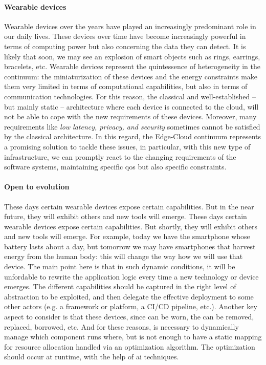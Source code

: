 \documentclass[12pt,a4paper]{article}
\begin{document}
\paragraph{Wearable devices}
Wearable devices over the years have played an increasingly predominant role in our daily lives.
These devices over time have become increasingly powerful in terms of computing power but also concerning the data they can detect.
%
It is likely that soon,
we may see an explosion of smart objects such as rings,
earrings, bracelets, etc. 
%
Wearable devices represent the quintessence of heterogeneity in the continuum:
the miniaturization of these devices and the energy constraints make them very limited in terms of computational capabilities,
but also in terms of communication technologies. 
%
For this reason,
the classical and well-established -- but mainly static -- architecture where each device is connected to the cloud,
will not be able to cope with the new requirements of these devices.
%
Moreover,
many requirements like \emph{low latency, privacy, and security} sometimes cannot be satisfied by the classical architecture. 
%
In this regard,
the Edge-Cloud continuum represents a promising solution to tackle these issues,
in particular,
with this new type of infrastructure,
we can promptly react to the changing requirements of the software systems,
maintaining specific \ac{qos} but also specific constraints.

\paragraph{Open to evolution}
These days certain wearable devices expose certain capabilities.
%
But in the near future,
they will exhibit others and new tools will emerge.
%
These days certain wearable devices expose certain capabilities.
But shortly, they will exhibit others and new tools will emerge.
%
For example,
today we have the smartphone whose battery lasts about a day,
but tomorrow we may have smartphones that harvest energy from the human body:
this will change the way how we will use that device.
%
The main point here is that in such dynamic conditions,
it will be unfordable to rewrite the application logic every time a new technology or device emerges.
%
The different capabilities should be captured in the right level of abstraction to be exploited,
and then delegate the effective deployment to some other actors (e.g. a framework or platform, a CI/CD pipeline, etc.).
%
Another key aspect to consider is that these devices,
since can be worn,
the can be removed,
replaced,
borrowed, etc.
%
And for these reasons,
is necessary to dynamically manage which component runs where,
but is not enough to have a static mapping for resource allocation handled via an optimization algorithm.
%
The optimization should occur at runtime,
with the help of \ac{ai} techniques.
\end{document}
